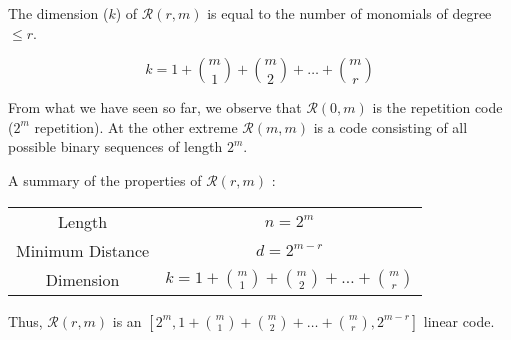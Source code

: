 \documentclass{beamer}
\newcommand{\RM}[2]{\ensuremath{\mathcal{R}(#1,#2)}}
\begin{document}

\begin{frame}
 \begin{obs}
  The dimension ($k$) of $\RM{r}{m}$ is equal to the  number of monomials of degree $\leq r$.
\end{obs}

\begin{equation}
  \label{eq:2}
 k= 1+\binom{m}{1}+\binom{m}{2}+\ldots+\binom{m}{r}
\end{equation}

From what we have seen so far, we observe that $\RM{0}{m} $ is the repetition code ($2^m$ repetition). At the other extreme $\RM{m}{m}$ is a code consisting of all possible binary sequences of length $2^m$.

A summary of the properties of $\RM{r}{m}$ :
\begin{center}
\begin{tabular}[center]{|c|c|}
\hline
Length & $n = 2^m$ \\
Minimum Distance & $d = 2^{m-r}$ \\
Dimension & $k= 1+\binom{m}{1}+\binom{m}{2}+\ldots+\binom{m}{r}$ \\
\hline
\end{tabular}
\end{center}

Thus, $\RM{r}{m}$ is an $[2^m,1+\binom{m}{1}+\binom{m}{2}+\ldots+\binom{m}{r}, 2^{m-r}]$ linear code.

\end{frame}

\end{document}
